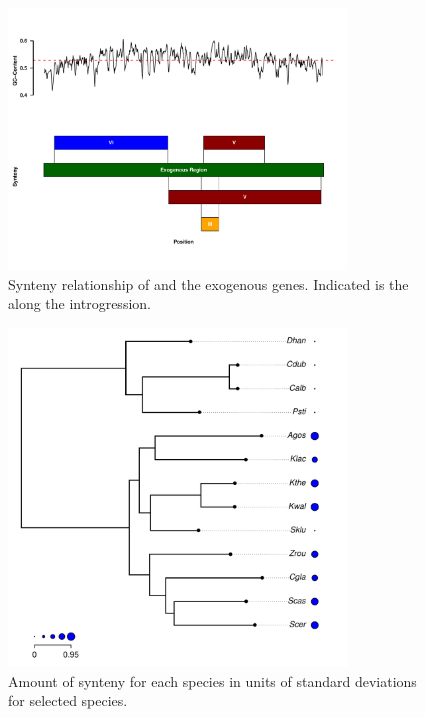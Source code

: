 \documentclass[fleqn,letterpaper]{article}
\begin{document}
\null
\vfill
\begin{figure}
     \centering
	\includegraphics[width=0.8\textwidth]{img/synteny_blocks_and_gc.pdf}
	\caption{Synteny relationship of \gossypii and the exogenous genes. Indicated is the \GC along the introgression.}
	\label{fig:synt_rel}
\end{figure}
\null
\vfill
\clearpage
\null
\vfill
\begin{figure}
     \centering
	\includegraphics[width=0.8\textwidth]{img/synteny_coverage.pdf}
	\caption{Amount of synteny for each species in units of standard deviations for selected species.}
	\label{fig:synteny_species}
\end{figure}
\null
\vfill
\clearpage
\null
\vfill
\end{document}
